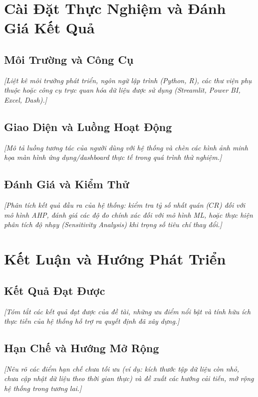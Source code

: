 \documentclass[12pt]{article}
\begin{document}
\section{Cài Đặt Thực Nghiệm và Đánh Giá Kết Quả}

\subsection{Môi Trường và Công Cụ}
\textit{[Liệt kê môi trường phát triển, ngôn ngữ lập trình (Python, R), các thư viện phụ thuộc hoặc công cụ trực quan hóa dữ liệu được sử dụng (Streamlit, Power BI, Excel, Dash).]}

\subsection{Giao Diện và Luồng Hoạt Động}
\textit{[Mô tả luồng tương tác của người dùng với hệ thống và chèn các hình ảnh minh họa màn hình ứng dụng/dashboard thực tế trong quá trình thử nghiệm.]}

\subsection{Đánh Giá và Kiểm Thử}
\textit{[Phân tích kết quả đầu ra của hệ thống: kiểm tra tỷ số nhất quán ($CR$) đối với mô hình AHP, đánh giá các độ đo chính xác đối với mô hình ML, hoặc thực hiện phân tích độ nhạy (Sensitivity Analysis) khi trọng số tiêu chí thay đổi.]}

\section{Kết Luận và Hướng Phát Triển}

\subsection{Kết Quả Đạt Được}
\textit{[Tóm tắt các kết quả đạt được của đề tài, những ưu điểm nổi bật và tính hữu ích thực tiễn của hệ thống hỗ trợ ra quyết định đã xây dựng.]}

\subsection{Hạn Chế và Hướng Mở Rộng}
\textit{[Nêu rõ các điểm hạn chế chưa tối ưu (ví dụ: kích thước tập dữ liệu còn nhỏ, chưa cập nhật dữ liệu theo thời gian thực) và đề xuất các hướng cải tiến, mở rộng hệ thống trong tương lai.]}

\newpage


\end{document}
